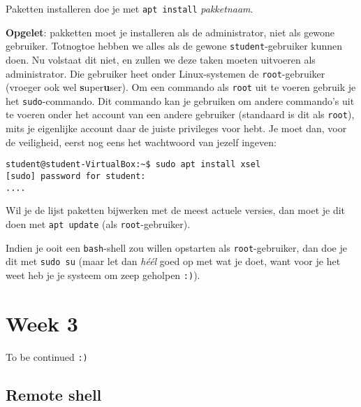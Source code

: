 \documentclass[a4paper,twoside,openany]{memoir}
\begin{document}
Paketten installeren doe je met \verb!apt install! \emph{pakketnaam}.

\textbf{Opgelet}: pakketten moet je installeren als de administrator, niet als
gewone gebruiker. Totnogtoe hebben we alles als de gewone
\verb!student!-gebruiker kunnen doen. Nu volstaat dit niet, en zullen we deze
taken moeten uitvoeren als administrator. Die gebruiker heet onder
Linux-systemen de \verb!root!-gebruiker (vroeger ook wel
\textbf{s}uper\textbf{u}ser). Om een commando als \verb!root! uit te voeren
gebruik je het \verb!sudo!-commando. Dit commando kan je gebruiken om andere
commando's uit te voeren onder het account van een andere gebruiker (standaard
is dit als \verb!root!), mits je eigenlijke account daar de juiste privileges
voor hebt. Je moet dan, voor de veiligheid, eerst nog eens het wachtwoord van
jezelf ingeven:

\begin{verbatim}
student@student-VirtualBox:~$ sudo apt install xsel
[sudo] password for student: 
....
\end{verbatim}

Wil je de lijst paketten bijwerken met de meest actuele versies, dan moet je dit
doen met \verb!apt update! (als \verb!root!-gebruiker).

Indien je ooit een \verb!bash!-shell zou willen opstarten als
\verb!root!-gebruiker, dan doe je dit met \verb!sudo su! (maar let dan
\emph{h\'e\'el} goed op met wat je doet, want voor je het weet heb je je systeem
om zeep geholpen \verb!:)!).

\part{Week 3}

To be continued \verb!:)!

\chapter{Remote shell}

% 
% 
\end{document}
